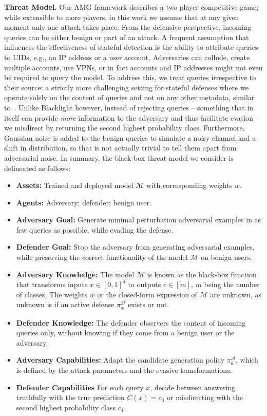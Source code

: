 \textbf{Threat Model.} Our AMG framework describes a two-player competitive game; while extensible to more players, in this work we assume that at any given moment only one attack takes place.
From the defensive perspective, incoming queries can be either benign or part of an attack.
A frequent assumption that influences the effectiveness of stateful detection is the ability to attribute queries to UIDs, e.g., an IP address or a user account.
Adversaries can collude, create multiple accounts, use VPNs, or in fact accounts and IP addresses might not even be required to query the model.
To address this, we treat queries irrespective to their source: a strictly more challenging setting for stateful defenses where we operate solely on the content of queries and not on any other metadata, similar to~\cite{li2022blacklight}.
Unlike Blacklight however, instead of rejecting queries -- something that in itself can provide \textit{more} information to the adversary and thus facilitate evasion \cite{feng2023stateful} -- we misdirect by returning the second highest probability class.
Furthermore, Gaussian noise is added to the benign queries to simulate a noisy channel and a shift in distribution, so that is not actually trivial to tell them apart from adversarial noise.
In summary, the black-box threat model we consider is delineated as follows:

\begin{itemize}
    \item \textbf{Assets:} Trained and deployed model $\mathcal{M}$ with corresponding weights ${w}$.
    \item \textbf{Agents:} Adversary; defender; benign user.
    \item \textbf{Adversary Goal:} Generate minimal perturbation adversarial examples in as few queries as possible, while evading the defense.
    \item \textbf{Defender Goal:} Stop the adversary from generating adversarial examples, while preserving the correct functionality of the model $\mathcal{M}$ on benign users.
    \item \textbf{Adversary Knowledge:} The model $\mathcal{M}$ is known as the black-box function that transforms inputs $x \in [0,1]^d$ to outputs $c \in [m]$, $m$ being the number of classes. The weights ${w}$ or the closed-form expression of $\mathcal{M}$ are unknown, as unknown is if an active defense $\pi_\phi^{\mathcal{D}}$ exists or not.
    \item \textbf{Defender Knowledge:} The defender observers the content of incoming queries only, without knowing if they come from a benign user or the adversary.
    \item \textbf{Adversary Capabilities:} Adapt the candidate generation policy $\pi^{\mathcal{A}}_\theta$, which is defined by the attack parameters and the evasive transformations.
    \item \textbf{Defender Capabilities} For each query $x$, decide between answering truthfully with the true prediction $C(x) = c_0$ or misdirecting with the second highest probability class $c_1$.
\end{itemize}

